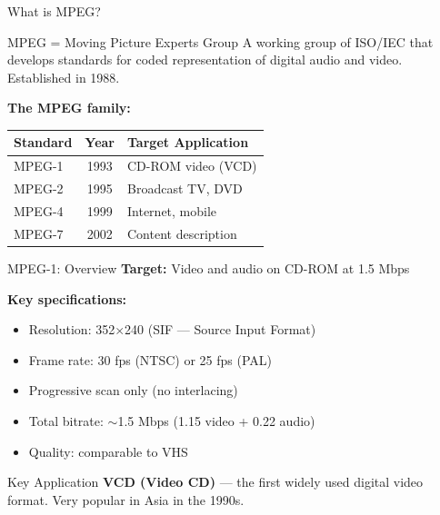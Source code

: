 \documentclass[aspectratio=169,12pt]{beamer}
\begin{document}
\begin{frame}{What is MPEG?}
    \begin{block}{MPEG = Moving Picture Experts Group}
        A working group of ISO/IEC that develops standards for coded representation of digital audio and video. Established in 1988.
    \end{block}
    
    \vspace{0.3cm}
    \textbf{The MPEG family:}
    \begin{center}
        \begin{tabular}{l|c|l}
            \toprule
            \textbf{Standard} & \textbf{Year} & \textbf{Target Application} \\
            \midrule
            MPEG-1 & 1993 & CD-ROM video (VCD) \\
            MPEG-2 & 1995 & Broadcast TV, DVD \\
            MPEG-4 & 1999 & Internet, mobile \\
            MPEG-7 & 2002 & Content description \\
            \bottomrule
        \end{tabular}
    \end{center}
\end{frame}

\begin{frame}{MPEG-1: Overview}
    \textbf{Target:} Video and audio on CD-ROM at 1.5 Mbps
    
    \vspace{0.3cm}
    \textbf{Key specifications:}
    \begin{itemize}
        \item Resolution: 352$\times$240 (SIF --- Source Input Format)
        \item Frame rate: 30 fps (NTSC) or 25 fps (PAL)
        \item Progressive scan only (no interlacing)
        \item Total bitrate: $\sim$1.5 Mbps (1.15 video + 0.22 audio)
        \item Quality: comparable to VHS
    \end{itemize}
    
    \vspace{0.3cm}
    \begin{block}{Key Application}
        \textbf{VCD (Video CD)} --- the first widely used digital video format. Very popular in Asia in the 1990s.
    \end{block}
\end{frame}
\end{document}
